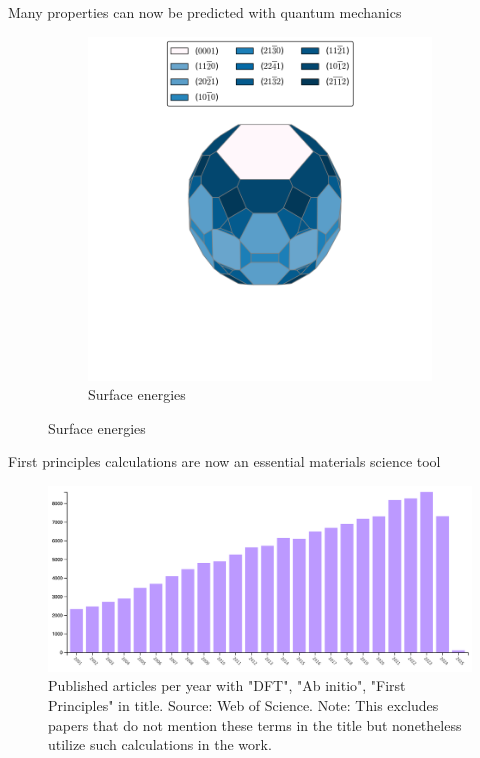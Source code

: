 \documentclass[aspectratio=169]{beamer}
\begin{document}
\begin{frame}{Many properties can now be predicted with quantum mechanics}
\begin{figure}
\begin{subfigure}{0.2\textwidth}
        \includegraphics[width=\linewidth]{lectures/figures/1_surfaces.png}
    \caption{Surface energies\cite{tranSurfaceEnergiesElemental2016}}
    \end{subfigure}
\end{figure}

\end{frame}


\begin{frame}{First principles calculations are now an essential materials science tool}
\begin{figure}
    \centering
    \includegraphics[width=0.8\linewidth]{lectures/figures/1_Papers_per_year.png}
    \caption{Published articles per year with "DFT", "Ab initio", "First Principles" in title. Source: Web of Science. Note: This excludes papers that do not mention these terms in the title but nonetheless utilize such calculations in the work.}
\end{figure}
\end{frame}
\end{document}

